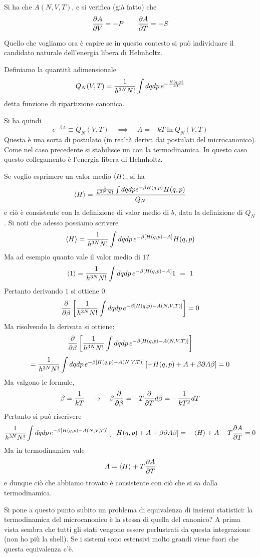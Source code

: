 \documentclass[../MeccanicaStatistica.tex]{subfiles}
\begin{document}
Si ha che $A(N,V,T)$, e si verifica (già fatto) che
\[
\frac{\partial A}{\partial V} = - P \qquad \frac{\partial A}{\partial T} = - S
\]

Quello che vogliamo ora è capire se in questo contesto si può individuare il candidato naturale dell'energia libera di Helmholtz.

Definiamo la quantità adimensionale
\[
Q_N(V,T) = \frac{1}{h^{3N} N!} \int d q d p \, e^{- \frac{H(q,p)}{kT}}
\]
detta funzione di ripartizione canonica.

Si ha quindi
\[
e^{-\beta A} \equiv Q_N(V,T) \quad \implies \quad A = - k T \ln Q_N(V,T)
\]
Questa è una sorta di postulato (in realtà deriva dai postulati del microcanonico).
Come nel caso precedente si stabilisce un  con la termodinamica. In questo caso questo collegamento è l'energia libera di Helmholtz.

Se voglio esprimere un valor medio $\left\langle{H}\right\rangle$, si ha
\[
\left\langle{H}\right\rangle = \frac{\frac{1}{h^{3N} N!} \int d q d p e^{- \beta H(q,p)} H(q,p)}{Q_N}
\]
e ciò è consistente con la definizione di valor medio di $b$, data la definizione di $Q_N$. Si noti che adesso possiamo scrivere
\[
\left\langle{H}\right\rangle = \frac{1}{h^{3N} N!} \int d q d p \, e^{- \beta [H(q,p) - A]} H(q,p)
\]
Ma ad esempio quanto vale il valor medio di $1$?
\[
\left\langle{1}\right\rangle = \frac{1}{h^{3N} N!} \int d q d p \, e^{- \beta [H(q,p) - A]} 1 \ = \ 1
\]
Pertanto derivando $1$ si ottiene $0$:
\[
\frac{\partial }{\partial \beta} \left[\frac{1}{h^{3N} N!} \int d q d p \, e^{- \beta [H(q,p) - A(N,V,T)]}\right] = 0
\]
Ma risolvendo la derivata si ottiene:
\[
\frac{\partial }{\partial \beta} \left[\frac{1}{h^{3N} N!} \int d q d p \, e^{- \beta [H(q,p) - A(N,V,T)]}\right]
\]
\[
= \frac{1}{h^{3N} N!} \int d q d p \, e^{- \beta [H(q,p) - A(N,V,T)]} \left[ -H(q,p) + A + \beta \partial{A}{\beta} \right] = 0
\]
Ma valgono le formule,
\[
\beta = \frac{1}{k T} \quad \to \quad \beta \frac{\partial }{\partial \beta} = - T \frac{\partial }{\partial T}
d \beta = -\frac{1}{kT^2} d T
\]
Pertanto si può riscrivere
\[
\frac{1}{h^{3N} N!} \int d q d p \, e^{- \beta [H(q,p) - A(N,V,T)]} \left[ -H(q,p) + A + \beta \partial{A}{\beta} \right] = -\left\langle{H}\right\rangle + A - T \frac{\partial A}{\partial T} = 0
\]
Ma in termodinamica vale
\[
A = \left\langle{H}\right\rangle + T \frac{\partial A}{\partial T}
\]
e dunque ciò che abbiamo trovato è consistente con ciò che si sa dalla termodinamica.

Si pone a questo punto subito un problema di equivalenza di insiemi statistici: la termodinamica del microcanonico è la stessa di quella del canonico? A prima vista sembra che tutti gli stati vengono essere perlustrati da questa integrazione (non ho più la shell). Se i sistemi sono estensivi molto grandi viene fuori che questa equivalenza c'è.
\end{document}
